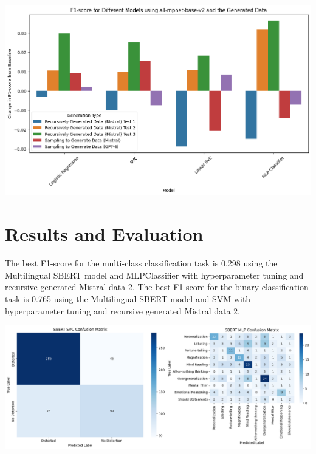 \documentclass[a0,landscape]{a0poster}
\begin{document}
\begin{multicols}{4}
\begin{center}
\includegraphics[width=0.96\linewidth]{figures/generatedDataDiffDiff.png}
\end{center}\vspace{1cm}


\color{Teal}
\section*{Results and Evaluation}
\color{Black}

The best F1-score for the multi-class classification task is 0.298 using the Multilingual SBERT model and MLPClassifier with hyperparameter tuning and recursive generated Mistral data 2. The best F1-score for the binary classification task is 0.765 using the Multilingual SBERT model and SVM with hyperparameter tuning and recursive generated Mistral data 2. 

\begin{center}
\includegraphics[width=0.96\linewidth]{figures/finalGraphs.png}
\end{center}\vspace{1cm}


\end{multicols}
\end{document}
